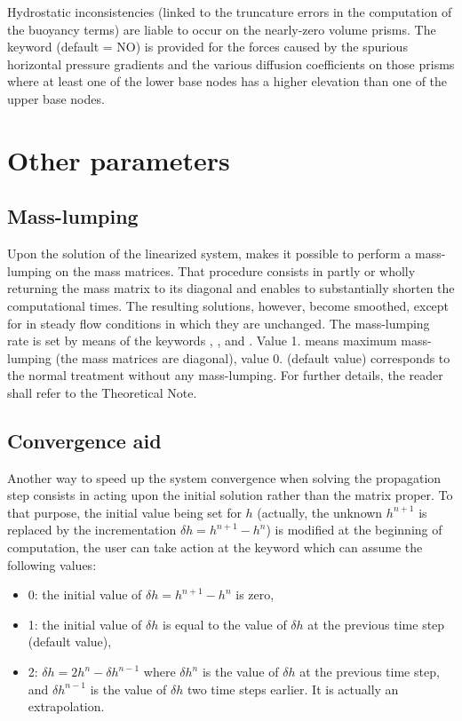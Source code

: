 Hydrostatic inconsistencies (linked to the truncature errors in the computation
of the buoyancy terms) are liable to occur on the nearly-zero volume prisms.
The keyword  (default = NO) is
provided for the forces caused by the spurious horizontal pressure gradients
and the various diffusion coefficients on those prisms where at least one of
the lower base nodes has a higher elevation than one of the upper base nodes.

\section{Other parameters}

\subsection{Mass-lumping}

Upon the solution of the linearized system,  makes it possible to
perform a mass-lumping on the mass matrices. That procedure consists in partly
or wholly returning the mass matrix to its diagonal and enables to
substantially shorten the computational times. The resulting solutions,
however, become smoothed, except for in steady flow conditions in which they
are unchanged. The mass-lumping rate is set by means of the keywords
, ,
 and . Value 1. means maximum mass-lumping (the mass matrices are
diagonal), value 0. (default value) corresponds to the normal treatment without
any mass-lumping. For further details, the reader shall refer to the 
Theoretical Note.

\subsection{Convergence aid}

Another way to speed up the system convergence when solving the propagation
step consists in acting upon the initial solution rather than the matrix
proper. To that purpose, the initial value being set for $h$ (actually,
the unknown $h^{n+1}$ is replaced by the incrementation $\delta h=h^{n+1} -h^{n}$)
is modified at the beginning of computation, the user can take action at the
keyword  which can assume the following values:

\begin{itemize}
\item 0: the initial value of $\delta h=h^{n+1} -h^{n} $ is zero,

\item 1: the initial value of $\delta h$ is equal to the value of $\delta h$
at the previous time step (default value),

\item 2: $\delta h=2h^{n} -\delta h^{n-1} $ where $\delta h^{n} $ is the value
of $\delta h$ at the previous time step, and $\delta h^{n-1} $ is the value of
$\delta h$ two time steps earlier. It is actually an extrapolation.
\end{itemize}


